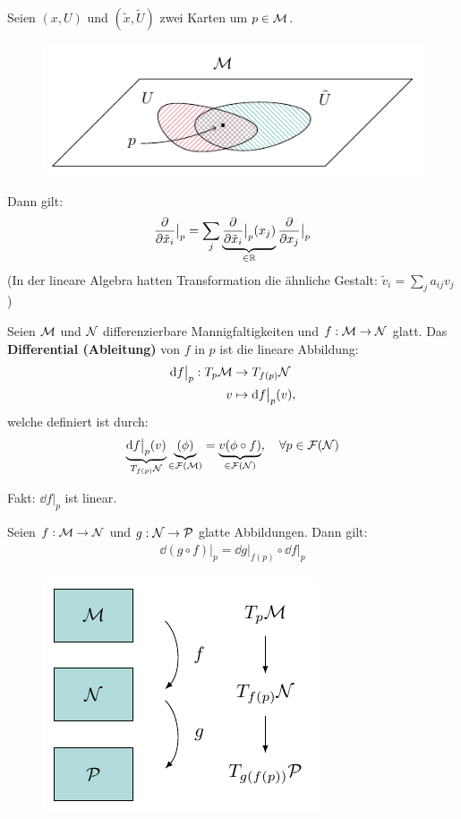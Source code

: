 \begin{satz}[Transformationsregel]
Seien $(x, U)$ und $(\tilde{x}, \tilde{U})$ zwei Karten um $p \in \mathcal{M}$.
\begin{figure}[H]
\centering
\includegraphics[scale=1.0]{figures/tikz/transformationlaw.pdf}
\label{img:transformationsregel}
\end{figure}  
Dann gilt:
\begin{align}
\pdv{\tilde{x}_i} \big\vert_p  = \sum_j \underbrace{\pdv{\tilde{x}_i} \big\vert_p  (x_j)}_{\in \mathbb{R}} \pdv{x_j} \big\vert_p 
\end{align}
(In der lineare Algebra hatten Transformation die ähnliche Gestalt: $\tilde{v}_i = \sum_j a_{i j } v_j$)
\end{satz}
\begin{defs}
Seien $\mathcal{M}$ und $\mathcal{N}$ differenzierbare Mannigfaltigkeiten und $f: \mathcal{M} \to \mathcal{N}$ glatt.
Das \textbf{Differential (Ableitung)} von $f$ in $p$ ist die lineare Abbildung:
\begin{align}
\dd f \big\vert_p : T_{p} \mathcal{M} &\to T_{f(p)}\mathcal{N} \\
v &\mapsto \dd f \big\vert_p (v),
\end{align}
welche definiert ist durch:
\begin{align}
\underbrace{\dd f \big\vert_p (v)}_{T_{f(p)}\mathcal{N}} \underbrace{(\phi)}_{\in \mathcal{F}(\mathcal{M})} = \underbrace{v(\phi \circ f)}_{\in \mathcal{F}(\mathcal{N})}, \quad \forall p \in \mathcal{F}(\mathcal{N})
\end{align}
\end{defs}
Fakt: $\dd f \big\vert_p$ ist linear.
\begin{satz}[Kettenregel]
\label{satz:Kettenregel}
Seien $f: \mathcal{M} \to \mathcal{N}$ und $g: \mathcal{N} \to \mathcal{P}$ glatte Abbildungen.
Dann gilt:
\begin{align}
\dd (g \circ f) \big\vert_p = \dd g \big\vert_{f(p)} \circ \dd f \big\vert_p
\end{align}
\begin{figure}[H]
\centering
\includegraphics[width=0.45\linewidth]{figures/tikz/chain_rule.pdf}
\label{img:kettenregel}
\end{figure} 
\end{satz}

